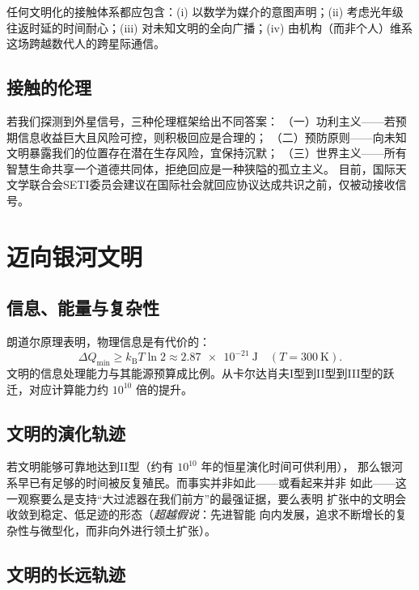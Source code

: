 \documentclass[12pt,a4paper]{article}
\newcommand{\kB}{k_{\mathrm{B}}}
\begin{document}
任何文明化的接触体系都应包含：(i) 以数学为媒介的意图声明；(ii) 考虑光年级往返时延的时间耐心；(iii) 对未知文明的全向广播；(iv) 由机构（而非个人）维系这场跨越数代人的跨星际通信。

\subsection{接触的伦理}

若我们探测到外星信号，三种伦理框架给出不同答案：
（一）功利主义——若预期信息收益巨大且风险可控，则积极回应是合理的；
（二）预防原则——向未知文明暴露我们的位置存在潜在生存风险，宜保持沉默；
（三）世界主义——所有智慧生命共享一个道德共同体，拒绝回应是一种狭隘的孤立主义。
目前，国际天文学联合会SETI委员会建议在国际社会就回应协议达成共识之前，仅被动接收信号。

\section{迈向银河文明}

\subsection{信息、能量与复杂性}

朗道尔原理表明，物理信息是有代价的：
\begin{equation}
  \Delta Q_{\min} \geq \kB T \ln 2 \approx \SI{2.87e-21}{\joule}
  \quad (T = \SI{300}{\kelvin}).
\end{equation}
文明的信息处理能力与其能源预算成比例。从卡尔达肖夫I型到II型到III型的跃迁，对应计算能力约 $10^{10}$ 倍的提升。

\subsection{文明的演化轨迹}

若文明能够可靠地达到II型（约有 $10^{10}$ 年的恒星演化时间可供利用），
那么银河系早已有足够的时间被反复殖民。而事实并非如此——或看起来并非
如此——这一观察要么是支持``大过滤器在我们前方''的最强证据，要么表明
扩张中的文明会收敛到稳定、低足迹的形态（\emph{超越假说}：先进智能
向内发展，追求不断增长的复杂性与微型化，而非向外进行领土扩张）。

\subsection{文明的长远轨迹}
\end{document}
